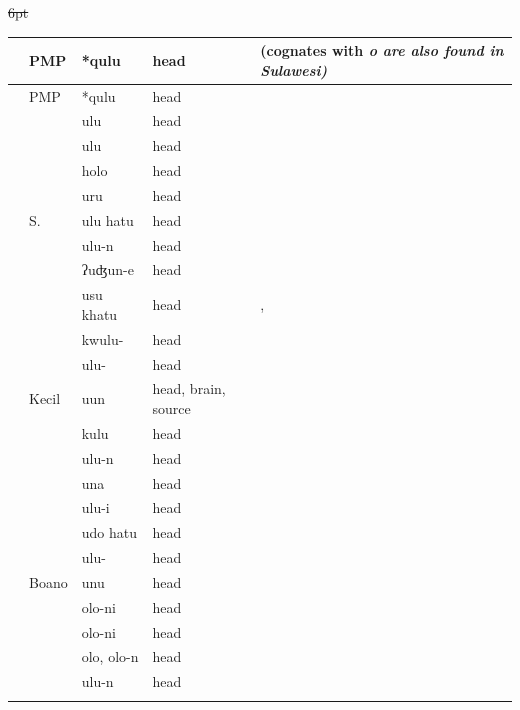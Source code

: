 {\st{6pt}\begin{xltabular}[l]{\linewidth}
{>{\hspace{-\tabcolsep}}l<{\hspace{-\tabcolsep}}
>{\hspace{-\tabcolsep}\enspace}lll
>{\raggedright\arraybackslash}X}
\lsptoprule
{}	&	PMP	&	*qulu	&	head	&	(cognates with \it{o} are also found in Sulawesi)	\\	\midrule
\endfirsthead
\lsptoprule
{}	&	PMP	&	*qulu	&	head	&		\\	\midrule
\endhead
	&		&	ulu	&	head	&		\\
	&		&	ulu	&	head	&		\\
\rcl	&		&	holo	&	head	&		\\
	&		&	uru	&	head	&		\\
	&	S. 	&	ulu hatu	&	head	&		\\
	&		&	ulu-n	&	head	&		\\
	&		&	ʔuʤun-e	&	head	&		\\
	&		&	usu khatu	&	head	&	, 	\\
	&		&	kwulu-	&	head	&		\\
	&		&	ulu-	&	head	&		\\
	&	 Kecil	&	uun	&	head, brain, source	&		\\
	&		&	kulu	&	head	&		\\
	&		&	ulu-n	&	head	&		\\
	&		&	una	&	head	&		\\
	&		&	ulu-i	&	head	&		\\
\rcl	&		&	udo hatu	&	head	&		\\
	&		&	ulu-	&	head	&		\\
	&	Boano	&	unu	&	head	&		\\
\rcl	&		&	olo-ni	&	head	&		\\
\rcl	&		&	olo-ni	&	head	&		\\
\rcl	&		&	olo, olo-n	&	head	&		\\
	&		&	ulu-n	&	head	&		\\
\lspbottomrule
\end{xltabular}\addtocounter{table}{-1}}

